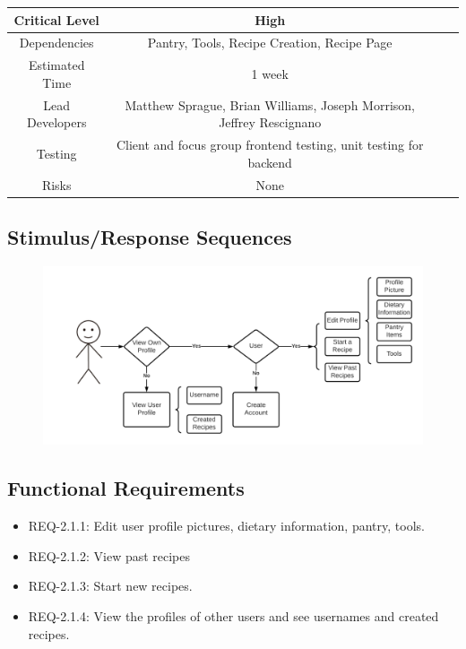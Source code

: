 \documentclass{scrreprt}
\begin{document}
\begin{center}
    \begin{tabular}{| c | c | c | c |}
        \hline
        Critical Level  & High                                                                 \\
        \hline
        Dependencies    & Pantry, Tools, Recipe Creation, Recipe Page                          \\
        \hline
        Estimated Time  & 1 week                                                               \\
        \hline
        Lead Developers & Matthew Sprague, Brian Williams, Joseph Morrison, Jeffrey Rescignano \\
        \hline
        Testing         & Client and focus group frontend testing, unit testing for backend    \\
        \hline
        Risks           & None                                                                 \\
        \hline
    \end{tabular}
\end{center}

\subsection{Stimulus/Response Sequences}

\begin{figure}[H]\centering
    \includegraphics[width=\columnwidth]{FlowCharts/Profile-Profile.png}
\end{figure}

\subsection{Functional Requirements}

\begin{itemize}
    \item REQ-2.1.1: Edit user profile pictures, dietary information, pantry, tools.
    \item REQ-2.1.2: View past recipes
    \item REQ-2.1.3: Start new recipes.
    \item REQ-2.1.4: View the profiles of other users and see usernames and created recipes.
\end{itemize}
\end{document}

